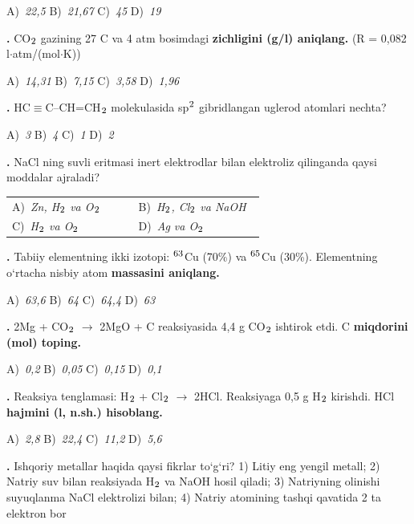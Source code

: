 \documentclass[11pt,a4paper]{article}
\renewcommand{\textsubscript}[1]{\ensuremath{_{\text{\fontsize{8}{8}\selectfont #1}}}}
\renewcommand{\textsuperscript}[1]{\ensuremath{^{\text{\fontsize{8}{8}\selectfont #1}}}}
\newcommand{\qn}[1]{\textbf{\fontsize{11.5}{13}\selectfont #1}}
\newcommand{\qsep}{\par\vspace{1pt}\noindent\rule{0pt}{0.4pt}\par\vspace{5pt}}
\begin{document}
\begin{multicols}{2}
\noindent A)~\textsl{22,5} \hfill B)~\textsl{21,67} \hfill C)~\textsl{45} \hfill D)~\textsl{19}\par
\qsep
\noindent\qn{10.} CO\textsubscript{2} gazining 27 \textdegree{}C va 4 atm bosimdagi \textbf{zichligini (g/l) aniqlang.} (R = 0,082 l$\cdot$atm/(mol$\cdot$K))

\noindent A)~\textsl{14,31} \hfill B)~\textsl{7,15} \hfill C)~\textsl{3,58} \hfill D)~\textsl{1,96}\par
\qsep
\noindent\qn{11.} HC$\equiv$C--CH=CH\textsubscript{2} molekulasida sp\textsuperscript{2} gibridlangan uglerod atomlari nechta?

\noindent A)~\textsl{3} \hfill B)~\textsl{4} \hfill C)~\textsl{1} \hfill D)~\textsl{2}\par
\qsep
\noindent\qn{12.} NaCl ning suvli eritmasi inert elektrodlar bilan elektroliz qilinganda qaysi moddalar ajraladi?

\noindent\begin{tabular}{@{}p{0.47\linewidth}@{}p{0.47\linewidth}@{}}
A)~\textsl{Zn, H\textsubscript{2} va O\textsubscript{2}} & B)~\textsl{H\textsubscript{2}, Cl\textsubscript{2} va NaOH} \\
C)~\textsl{H\textsubscript{2} va O\textsubscript{2}} & D)~\textsl{Ag va O\textsubscript{2}} \\
\end{tabular}\par
\qsep
\noindent\qn{13.} Tabiiy elementning ikki izotopi: \textsuperscript{63}Cu (70\%) va \textsuperscript{65}Cu (30\%). Elementning o`rtacha nisbiy atom \textbf{massasini aniqlang.}

\noindent A)~\textsl{63,6} \hfill B)~\textsl{64} \hfill C)~\textsl{64,4} \hfill D)~\textsl{63}\par
\qsep
\noindent\qn{14.} 2Mg + CO\textsubscript{2} $\to$ 2MgO + C reaksiyasida 4,4 g CO\textsubscript{2} ishtirok etdi. C \textbf{miqdorini (mol) toping.}

\noindent A)~\textsl{0,2} \hfill B)~\textsl{0,05} \hfill C)~\textsl{0,15} \hfill D)~\textsl{0,1}\par
\qsep
\noindent\qn{15.} Reaksiya tenglamasi: H\textsubscript{2} + Cl\textsubscript{2} $\to$ 2HCl. Reaksiyaga 0,5 g H\textsubscript{2} kirishdi. HCl \textbf{hajmini (l, n.sh.) hisoblang.}

\noindent A)~\textsl{2,8} \hfill B)~\textsl{22,4} \hfill C)~\textsl{11,2} \hfill D)~\textsl{5,6}\par
\qsep
\noindent\qn{16.} Ishqoriy metallar haqida qaysi fikrlar to`g`ri? 1) Litiy eng yengil metall; 2) Natriy suv bilan reaksiyada H\textsubscript{2} va NaOH hosil qiladi; 3) Natriyning olinishi suyuqlanma NaCl elektrolizi bilan; 4) Natriy atomining tashqi qavatida 2 ta elektron bor


\end{multicols}
\end{document}
